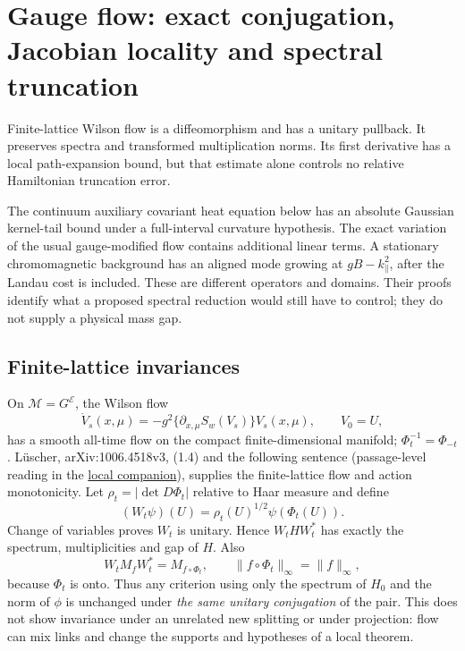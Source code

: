 \documentclass[11pt,a4paper]{article}
\begin{document}
\hypertarget{gauge-flow-exact-conjugation-jacobian-locality-and-spectral-truncation}{%
\section{Gauge flow: exact conjugation, Jacobian locality and spectral
truncation}\label{gauge-flow-exact-conjugation-jacobian-locality-and-spectral-truncation}}

Finite-lattice Wilson flow is a diffeomorphism and has a unitary
pullback. It preserves spectra and transformed multiplication norms. Its
first derivative has a local path-expansion bound, but that estimate
alone controls no relative Hamiltonian truncation error.

The continuum auxiliary covariant heat equation below has an absolute
Gaussian kernel-tail bound under a full-interval curvature hypothesis.
The exact variation of the usual gauge-modified flow contains additional
linear terms. A stationary chromomagnetic background has an aligned mode
growing at \(gB-k_\parallel^2\), after the Landau cost is included.
These are different operators and domains. Their proofs identify what a
proposed spectral reduction would still have to control; they do not
supply a physical mass gap.

\hypertarget{finite-lattice-invariances}{%
\subsection{Finite-lattice
invariances}\label{finite-lattice-invariances}}

On \(\mathcal M=G^{\mathcal E}\), the Wilson flow
\[\dot V_s(x,\mu)=-g^2\{\partial_{x,\mu}S_w(V_s)\}V_s(x,\mu),
\qquad V_0=U,\] has a smooth all-time flow on the compact
finite-dimensional manifold; \(\Phi_t^{-1}=\Phi_{-t}\). Lüscher,
arXiv:1006.4518v3, (1.4) and the following sentence (passage-level
reading in the \href{../docs/Luscher_WilsonFlow_1006.4518v3.md}{local
companion}), supplies the finite-lattice flow and action monotonicity.
Let \(\rho_t=|\det D\Phi_t|\) relative to Haar measure and define
\[(W_t\psi)(U)=\rho_t(U)^{1/2}\psi(\Phi_t(U)).\] Change of variables
proves \(W_t\) is unitary. Hence \(W_tHW_t^*\) has exactly the spectrum,
multiplicities and gap of \(H\). Also
\[W_tM_fW_t^*=M_{f\circ\Phi_t},\qquad
\|f\circ\Phi_t\|_\infty=\|f\|_\infty,\] because \(\Phi_t\) is onto. Thus
any criterion using only the spectrum of \(H_0\) and the norm of
\(\phi\) is unchanged under \emph{the same unitary conjugation} of the
pair. This does not show invariance under an unrelated new splitting or
under projection: flow can mix links and change the supports and
hypotheses of a local theorem.
\end{document}
